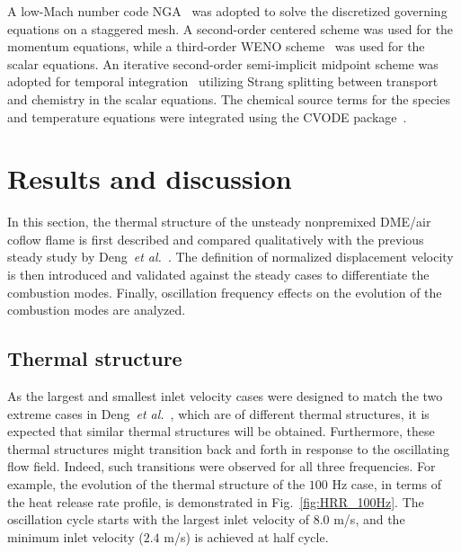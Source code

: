 \documentclass[review,3p,times]{elsarticle}
\begin{document}
A low-Mach number code NGA~\cite{desjardins08} was adopted to solve the discretized governing equations on a staggered mesh.  A second-order centered scheme was used for the momentum equations, while a third-order WENO scheme~\cite{liu94} was used for the scalar equations.  An iterative second-order semi-implicit midpoint scheme was adopted for temporal integration~\cite{pierce01} utilizing Strang splitting between transport and chemistry in the scalar equations.  The chemical source terms for the species and temperature equations were integrated using the CVODE package~\cite{cohen96}.


\section{Results and discussion}

In this section, the thermal structure of the unsteady nonpremixed DME/air coflow flame is first described and compared qualitatively with the previous steady study by Deng~\emph{et al.}~\cite{deng15b}.  The definition of normalized displacement velocity is then introduced and validated against the steady cases to differentiate the combustion modes.  Finally, oscillation frequency effects on the evolution of the combustion modes are analyzed.   

\subsection{Thermal structure}

As the largest and smallest inlet velocity cases were designed to match the two extreme cases in Deng~\emph{et al.}~\cite{deng15b}, which are of different thermal structures, it is expected that similar thermal structures will be obtained.  Furthermore, these thermal structures might transition back and forth in response to the oscillating flow field.  Indeed, such transitions were observed for all three frequencies.  For example, the evolution of the thermal structure of the $100$ Hz case, in terms of the heat release rate profile, is demonstrated in Fig.~\ref{fig:HRR_100Hz}.  The oscillation cycle starts with the largest inlet velocity of $8.0$ m/s, and the minimum inlet velocity ($2.4$ m/s) is achieved at half cycle.  
\end{document}
